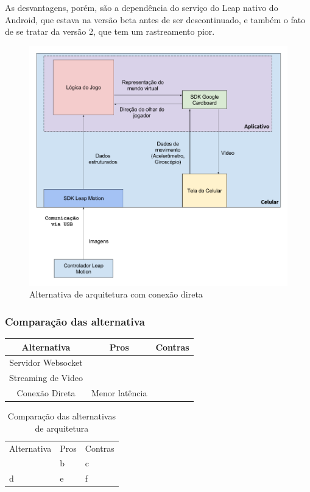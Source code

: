 As desvantagens, porém, são a dependência do serviço do Leap nativo do Android, que estava na versão beta antes de ser descontinuado, e também o fato de se tratar da versão 2, que tem um rastreamento pior.

\begin{figure}
	\centering
	\includegraphics[width=0.7\linewidth]{images/Arquitetura-leap-android}
	\caption{Alternativa de arquitetura com conexão direta}
	\label{fig:arquitetura-leap-android}
\end{figure}

\subsubsection{Comparação das alternativa}\label{subsubsec-arquiteturas-comparacao}

\begin{tabular}{|c|c|c|}
	\hline 
	\textbf{Alternativa} & \textbf{Pros} & \textbf{Contras} \\
	\hline 
	Servidor Websocket&  &  \\ 
	\hline 
	Streaming de Video&  &  \\ 
	\hline 
	Conexão Direta& Menor latência &  \\ 
	\hline 
\end{tabular} 

\begin{table}[h] \scriptsize
	\centering
	\begin{tabular} {| >{\centering\arraybackslash} m{2cm} | >{\centering\arraybackslash} m{3cm} | >{\centering\arraybackslash}m{3cm} |}
		\\ \hline
		Alternativa & Pros & Contras \\
		 & b & c \\ \hline
		d & e & f \\
	\end{tabular}
	\caption[Comparação das alternativas de arquitetura]{Comparação das alternativas de arquitetura}
	\label{tabela:alternativas-arquiteturas}
\end{table}